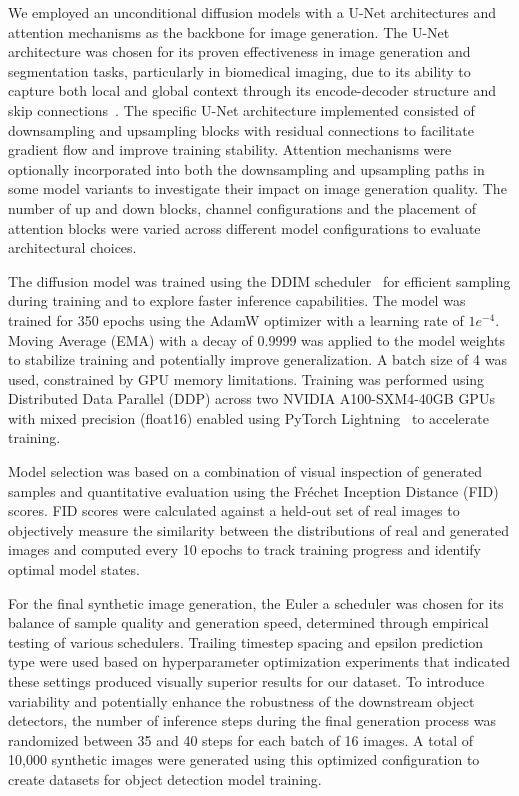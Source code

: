 We employed an unconditional diffusion models with a U-Net architectures and attention mechanisms as the backbone for image generation.
The U-Net architecture was chosen for its proven effectiveness in image generation and segmentation tasks, particularly in biomedical imaging, due to its ability to capture both local and global context through its encode-decoder structure and skip connections~\cite{ronneberger_u-net_2015}.
The specific U-Net architecture implemented consisted of downsampling and upsampling blocks with residual connections to facilitate gradient flow and improve training stability.
Attention mechanisms were optionally incorporated into both the downsampling and upsampling paths in some model variants to investigate their impact on image generation quality.
The number of up and down blocks, channel configurations and the placement of attention blocks were varied across different model configurations to evaluate architectural choices.

The diffusion model was trained using the DDIM scheduler~\cite{song_denoising_2020} for efficient sampling during training and to explore faster inference capabilities.
The model was trained for 350 epochs using the AdamW optimizer with a learning rate of $1e^{-4}$.
Moving Average (EMA) with a decay of 0.9999 was applied to the model weights to stabilize training and potentially improve generalization.
A batch size of 4 was used, constrained by GPU memory limitations.
Training was performed using Distributed Data Parallel (DDP) across two NVIDIA A100-SXM4-40GB GPUs with mixed precision (float16) enabled using PyTorch Lightning~\cite{falcon_pytorchlightningpytorch-lightning_2020} to accelerate training.

Model selection was based on a combination of visual inspection of generated samples and quantitative evaluation using the Fréchet Inception Distance (FID) scores.
FID scores were calculated against a held-out set of real images to objectively measure the similarity between the distributions of real and generated images and computed every 10 epochs to track training progress and identify optimal model states.

For the final synthetic image generation, the Euler a scheduler was chosen for its balance of sample quality and generation speed, determined through empirical testing of various schedulers.
Trailing timestep spacing and epsilon prediction type were used based on hyperparameter optimization experiments that indicated these settings produced visually superior results for our dataset.
To introduce variability and potentially enhance the robustness of the downstream object detectors, the number of inference steps during the final generation process was randomized between 35 and 40 steps for each batch of 16 images.
A total of 10,000 synthetic images were generated using this optimized configuration to create datasets for object detection model training.

